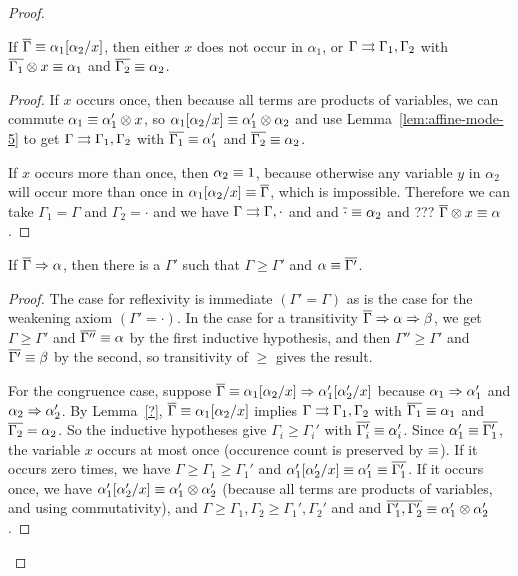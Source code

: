 \begin{proof}
\begin{lemma} \label{lem:affine-mode-3}
If $\overline{\Gamma} \equiv \alpha_1[\alpha_2/x]$, 
then 
either $x$ does not occur in $\alpha_1$, or 
$\Gamma \rightrightarrows \Gamma_1,\Gamma_2$ with 
$\overline{\Gamma_1} \otimes x \equiv \alpha_1$ 
and $\overline{\Gamma_2} \equiv \alpha_2$.  
\end{lemma}
\begin{proof}
If $x$ occurs once, then because all terms are products of variables, we
can commute $\alpha_1 \equiv \alpha_1' \otimes x$, so
$\alpha_1[\alpha_2/x] \equiv \alpha_1' \otimes \alpha_2$ and use
Lemma~\ref{lem:affine-mode-5} to get $\Gamma \rightrightarrows \Gamma_1,\Gamma_2$
with $\overline{\Gamma_1} \equiv \alpha_1'$ and $\overline{\Gamma_2} \equiv
\alpha_2$.

If $x$ occurs more than once, then $\alpha_2 \equiv 1$, because
otherwise any variable $y$ in $\alpha_2$ will occur more than once in 
$\alpha_1[\alpha_2/x] \equiv \overline{\Gamma}$, which is impossible.  
Therefore we can take $\Gamma_1 = \Gamma$ and $\Gamma_2 = \cdot$ and we
have $\Gamma \rightrightarrows \Gamma,\cdot$ and 
and $\overline{\cdot} \equiv \alpha_2$ and
??? $\overline{\Gamma} \otimes x \equiv \alpha$.
\end{proof}

\begin{lemma} \label{lem:affine-mode-4}
If $\overline{\Gamma} \Rightarrow \alpha$, then there is a $\Gamma'$ such that
$\Gamma \ge \Gamma'$ and $\alpha \equiv \overline{\Gamma'}$.
\end{lemma}

\begin{proof}
The case for reflexivity is immediate $(\Gamma' = \Gamma)$ as is the
case for the weakening axiom $(\Gamma' = \cdot)$.  In the case for a
transitivity $\overline{\Gamma} \Rightarrow \alpha \Rightarrow \beta$, we get $\Gamma \ge
\Gamma'$ and $\overline{\Gamma''} \equiv \alpha$ by the first inductive
hypothesis, and then $\Gamma'' \ge \Gamma'$ and $\overline{\Gamma'} \equiv
\beta$ by the second, so transitivity of $\ge$ gives the result.  

For the congruence case, suppose $\overline{\Gamma} \equiv
\alpha_1[\alpha_2/x] \Rightarrow \alpha_1'[\alpha_2'/x]$ because $\alpha_1 \Rightarrow
\alpha_1'$ and $\alpha_2 \Rightarrow \alpha_2'$.  By Lemma~\ref{?},
$\overline{\Gamma} \equiv \alpha_1[\alpha_2/x]$ implies $\Gamma \rightrightarrows
\Gamma_1,\Gamma_2$ with $\overline{\Gamma_1} \equiv \alpha_1$ and
$\overline{\Gamma_2} = \alpha_2$.  So the inductive hypotheses give
$\Gamma_i \ge \Gamma_i'$ with $\overline{\Gamma_i'} \equiv \alpha_i'$.  Since
$\alpha_1' \equiv \overline{\Gamma_1'}$, the variable $x$ occurs at most once
(occurence count is preserved by $\equiv$).  If it occurs zero times, we
have $\Gamma \ge \Gamma_1 \ge \Gamma_1'$ and $\alpha_1'[\alpha_2'/x]
\equiv \alpha_1' \equiv \overline{\Gamma_1'}$.  If it occurs once, we have
$\alpha_1'[\alpha_2'/x] \equiv \alpha_1' \otimes \alpha_2'$ (because all
terms are products of variables, and using commutativity), and $\Gamma
\ge \Gamma_1,\Gamma_2 \ge \Gamma_1',\Gamma_2'$ and and
$\overline{\Gamma_1',\Gamma_2'} \equiv {\alpha_1'} \otimes {\alpha_2'}$.
\end{proof}


\end{proof}
